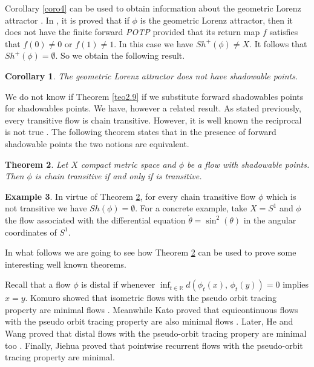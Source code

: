 \documentclass{amsart}
\newtheorem{theorem}{Theorem}[section]
\newtheorem{corollary}[theorem]{Corollary}
\theoremstyle{definition}
\newtheorem{example}[theorem]{Example}
\begin{document}


Corollary \ref{coro4} can be used to obtain information about the geometric Lorenz attractor \cite{Komuro85, Williams}. In \cite{Komuro85}, it is proved that if  $\phi$ is the geometric Lorenz attractor, then it does not have the finite forward {\em POTP} provided that its return map $f$ satisfies that $f(0)\neq 0$ or $f(1) \neq 1$. In this case we have  $Sh^+(\phi)\neq X$. It follows that $Sh^+(\phi)=\emptyset$.
So we obtain the following result. 
 
 \begin{corollary}\label{lorenz} The geometric Lorenz attractor does not have shadowable points.
 \end{corollary}
 
 We do not know if Theorem \ref{teo2.9} if we substitute forward shadowables points for shadowables points.  We have, however a related result. As stated previously, every transitive flow is chain transitive. However, it is well known the reciprocal is not true \cite{Alongi07}. The following theorem states that in the presence of forward shadowable points the two notions are equivalent.

\begin{theorem}\label{teo2.3.6}
	Let $X$ compact metric space and $\phi$ be a flow with shadowable points. Then $\phi$ is chain transitive if and only if is transitive.
\end{theorem}

\begin{example}
In virtue of Theorem \ref{teo2.3.6}, for every chain transitive flow $\phi$ which is not transitive we have $Sh(\phi) = \emptyset$. For a concrete example, take $X = S^1$ and $\phi$ the flow associated with the differential equation $\dot{\theta} = \sin^2(\theta)$ in the angular coordinates of $S^1$. 
\end{example}


In what follows we are going to see how Theorem  \ref{teo2.3.6} can be used to prove some interesting well known theorems.

Recall that a flow $\phi$ is distal if whenever $\inf_{t\in\mathbb{R}}d(\phi_t(x),\,\phi_t(y)) = 0$ implies $x=y$. Komuro showed that isometric flows with the pseudo orbit tracing property are minimal flows \cite{Komuro84}. Meanwhile Kato proved that equicontinuous flows with the pseudo orbit tracing property are also minimal flows \cite{Kato84}. Later,  He and Wang proved that distal flows with the pseudo-orbit tracing propery are minimal too \cite{He95}. Finally, Jiehua \cite{Jiehua1996} proved that pointwise recurrent flows with the pseudo-orbit tracing property are minimal.  
\end{document}
